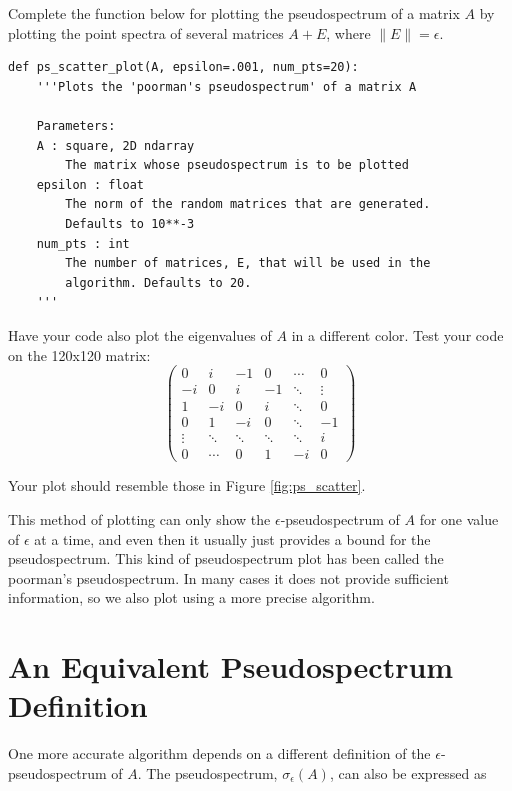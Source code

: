 \begin{problem}
Complete the function below for plotting the pseudospectrum of a matrix $A$ by plotting the point spectra of several matrices $A+E$, where $\lVert E \rVert = \epsilon$. 

\begin{lstlisting}
def ps_scatter_plot(A, epsilon=.001, num_pts=20):
    '''Plots the 'poorman's pseudospectrum' of a matrix A
    
    Parameters:
    A : square, 2D ndarray
        The matrix whose pseudospectrum is to be plotted
    epsilon : float
        The norm of the random matrices that are generated.
        Defaults to 10**-3
    num_pts : int
        The number of matrices, E, that will be used in the
        algorithm. Defaults to 20.       
    '''
\end{lstlisting}


Have your code also plot the eigenvalues of $A$ in a different color. Test your code on the 120x120 matrix:
\begin{equation}
	\begin{pmatrix}
		0  &  i  &  -1  &  0  & \cdots  &  0  \\
		-i &  0  &   i  & -1 & \ddots  &  \vdots  \\
		1  & -i  &   0  &  i &\ddots&  0  \\
		0   & 1 & -i & 0 &\ddots& -1\\
		\vdots   & \ddots    & \ddots & \ddots &\ddots & i\\
		 0  &  \cdots     &   0     &    1  &   -i  & 0
		\end{pmatrix}
\end{equation}

Your plot should resemble those in Figure \ref{fig:ps_scatter}.
\end{problem}

This method of plotting can only show the $\epsilon$-pseudospectrum of $A$ for one value of $\epsilon$ at a time, and even then it usually just provides a bound for the pseudospectrum. This kind of pseudospectrum plot has been called the poorman's pseudospectrum. In many cases it does not provide sufficient information, so we also plot using a more precise algorithm.

\section*{An Equivalent Pseudospectrum Definition}

One more accurate algorithm depends on a different definition of the $\epsilon$-pseudospectrum of $A$. The pseudospectrum, $\sigma _{\epsilon}(A)$, can also be expressed as 


